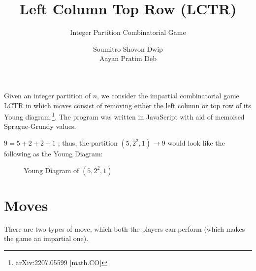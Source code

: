 \documentclass[11pt]{scrartcl}
\title{Left Column Top Row (LCTR)}
\subtitle{Integer Partition Combinatorial Game}
\author{Soumitro Shovon Dwip \\ Aayan Pratim Deb}
\begin{document}
	
	\maketitle
	
	\begin{mdframed}[style=mdpurplebox,frametitle={Game statement}]
		Given an integer partition of $n$, we consider the impartial combinatorial game LCTR in which moves consist of removing either the left column or top row of its Young diagram.\footnote[1]{arXiv:2207.05599 [math.CO]}. The program was written in JavaScript with aid of memoised Sprague-Grundy values. 
		

		
	
		
	\end{mdframed} 
	$9 = 5 + 2 + 2 + 1 $ ; thus, the partition $( 5, 2^2, 1 ) \to 9$ would look like the following as the Young Diagram: 
	
	\begin{figure}[!ht]
		\centering
		\caption{Young Diagram of $( 5, 2^2, 1 )$}
		\end{figure}
		\section*{Moves} 
		There are two types of move, which both the players can perform (which makes the game an impartial one). 
		
\end{document}
